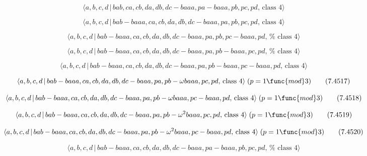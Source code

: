 \documentclass[10pt]{article}
\begin{document}
\begin{equation}
\langle a,b,c,d\,|\,bab,ca,cb,da,db,dc-baaa,pa-baaa,pb,pc,pd,\,\text{class }%
4\rangle  \tag{7.4512}
\end{equation}

\begin{equation}
\langle a,b,c,d\,|\,bab-baaa,ca,cb,da,db,dc-baaa,pa,pb,pc,pd,\,\text{class }%
4\rangle  \tag{7.4513}
\end{equation}

\begin{equation}
\langle a,b,c,d\,|\,bab-baaa,ca,cb,da,db,dc-baaa,pa,pb,pc-baaa,pd,\,\text{%
class }4\rangle  \tag{7.4514}
\end{equation}

\begin{equation}
\langle a,b,c,d\,|\,bab-baaa,ca,cb,da,db,dc-baaa,pa,pb-baaa,pc,pd,\,\text{%
class }4\rangle  \tag{7.4515}
\end{equation}

\begin{equation}
\langle a,b,c,d\,|\,bab-baaa,ca,cb,da,db,dc-baaa,pa,pb-baaa,pc-baaa,pd,\,%
\text{class }4\rangle  \tag{7.4516}
\end{equation}

\begin{equation}
\langle a,b,c,d\,|\,bab-baaa,ca,cb,da,db,dc-baaa,pa,pb-\omega baaa,pc,pd,\,%
\text{class }4\rangle \;(p=1\func{mod}3)  \tag{7.4517}
\end{equation}

\begin{equation}
\langle a,b,c,d\,|\,bab-baaa,ca,cb,da,db,dc-baaa,pa,pb-\omega
baaa,pc-baaa,pd,\,\text{class }4\rangle \;(p=1\func{mod}3)  \tag{7.4518}
\end{equation}

\begin{equation}
\langle a,b,c,d\,|\,bab-baaa,ca,cb,da,db,dc-baaa,pa,pb-\omega
^{2}baaa,pc,pd,\,\text{class }4\rangle \;(p=1\func{mod}3)  \tag{7.4519}
\end{equation}

\begin{equation}
\langle a,b,c,d\,|\,bab-baaa,ca,cb,da,db,dc-baaa,pa,pb-\omega
^{2}baaa,pc-baaa,pd,\,\text{class }4\rangle \;(p=1\func{mod}3)  \tag{7.4520}
\end{equation}

\begin{equation}
\langle a,b,c,d\,|\,bab-baaa,ca,cb,da,db,dc-baaa,pa-baaa,pb,pc,pd,\,\text{%
class }4\rangle  \tag{7.4521}
\end{equation}
\end{document}
